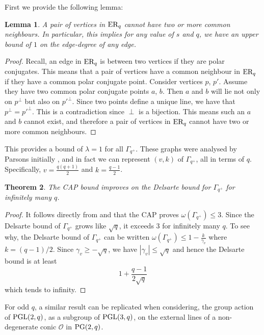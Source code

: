 \documentclass[11pt, baustms]{amsproc}
\theoremstyle{scplain}
\newtheorem{theorem}{Theorem}[section]
\newtheorem{lemma}[theorem]{Lemma}
\renewcommand\le{\leqslant}
\renewcommand\ge{\geqslant}
\begin{document}
First we provide the following lemma:
\begin{lemma}
		\label{edge}
	A pair of vertices in $\textnormal{ER}_q$ cannot have two or more common neighbours. In particular, this implies for any value of $s$ and $q$, we have an upper bound of $1$ on the edge-degree of any edge.
	\end{lemma}
	\begin{proof}
	Recall, an edge in $\textnormal{ER}_q$ is between two vertices if they are polar conjugates. This means that a pair of vertices have a common neighbour in $\textnormal{ER}_q$ if they have a common polar conjugate point. Consider vertices $p$, $p'$. Assume they have two common polar conjugate points $a$, $b$. Then $a$ and $b$ will lie not only on $p^\perp$ but also on $p'^\perp$. Since two points define a unique line, we have that $p^\perp = p'^\perp$. This is a contradiction since $\perp$ is a bijection. This means such an $a$ and $b$ cannot exist, and therefore a pair of vertices in $\textnormal{ER}_q$ cannot have two or more common neighbours.
	\end{proof}

This provides a bound of $\lambda = 1$ for all $\Gamma_{q^+}$.
These graphs were analysed by Parsons initially \cite{parse}, and in fact we can represent $(v,k)$ of $\Gamma_{q^+}$, all in terms of $q$. Specifically, $v = \frac{q(q+1)}{2}$ and $k = \frac{q-1}{2}$.

\begin{theorem}
		\label{edge_reg_1}
	The CAP bound improves on the Delsarte bound for $\Gamma_{q^+}$ for infinitely many $q$.
\end{theorem}

\begin{proof}
It follows directly from  and  that the CAP proves $\omega(\Gamma_{q^+})\le 3$.  
     Since the Delsarte bound of $\Gamma_{q^+}$ grows like $\sqrt q$, it exceeds $3$ for infinitely many $q$.
     To see why, the Delsarte bound of $\Gamma_{q^+}$ can be written $\omega(\Gamma_{q^+})\le 1-\frac{k}{\gamma_v}$
     where $k=(q-1)/2$. Since $\gamma_v\ge -\sqrt{q}$, we have $|\gamma_v|\le \sqrt{q}$ and hence the Delsarte
     bound is at least \[1+\frac{q-1}{2\sqrt{q}}\] which tends to infinity.
	\end{proof}


For odd $q$, a similar result can be replicated when considering, the group action of $\textnormal{PGL}(2, q)$, as a subgroup of $\textnormal{PGL}(3, q)$, on the external lines of a non-degenerate conic  $\mathcal{O}$ in $\textnormal{PG}(2,q)$.
\end{document}
